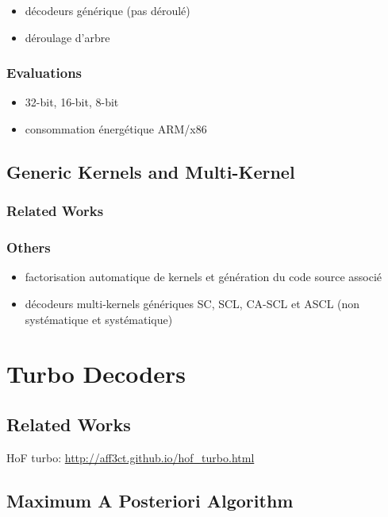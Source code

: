 \begin{itemize}
  \item décodeurs générique (pas déroulé)
  \item déroulage d'arbre
\end{itemize}

\subsubsection{Evaluations}

\begin{itemize}
  \item 32-bit, 16-bit, 8-bit
  \item consommation énergétique ARM/x86
\end{itemize}

\subsection{Generic Kernels and Multi-Kernel}

\subsubsection{Related Works}

\subsubsection{Others}

\begin{itemize}
  \item factorisation automatique de kernels et génération du code source
    associé
  \item décodeurs multi-kernels génériques SC, SCL, CA-SCL et ASCL (non
    systématique et systématique)
\end{itemize}

\section{Turbo Decoders~\cite{Cassagne2016a}}

\subsection{Related Works}

HoF turbo: \url{http://aff3ct.github.io/hof_turbo.html}

\subsection{Maximum A Posteriori Algorithm}

